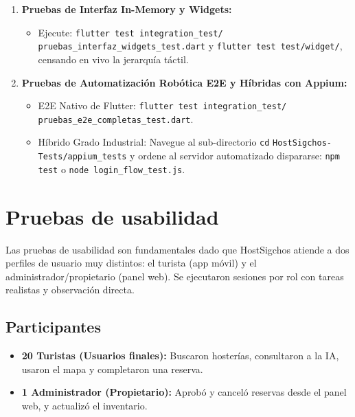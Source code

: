 \documentclass[12pt,letterpaper]{report}
\begin{document}
\begin{enumerate}
\begin{itemize}
    \end{itemize}
    \item \textbf{Pruebas de Interfaz In-Memory y Widgets:}
    \begin{itemize}
        \item Ejecute: \texttt{flutter test integration\_test/} \linebreak \texttt{pruebas\_interfaz\_widgets\_test.dart} y \texttt{flutter test test/widget/}, censando en vivo la jerarquía táctil.
    \end{itemize}
    \item \textbf{Pruebas de Automatización Robótica E2E y Híbridas con Appium:}
    \begin{itemize}
        \item E2E Nativo de Flutter: \texttt{flutter test integration\_test/} \linebreak \texttt{pruebas\_e2e\_completas\_test.dart}.
        \item Híbrido Grado Industrial: Navegue al sub-directorio \texttt{cd} \linebreak \texttt{HostSigchos-Tests/appium\_tests} y ordene al servidor automatizado dispararse: \linebreak \texttt{npm test} o \texttt{node login\_flow\_test.js}.
    \end{itemize}
\end{enumerate}

\section{Pruebas de usabilidad}
Las pruebas de usabilidad son fundamentales dado que HostSigchos atiende a dos perfiles de usuario muy distintos: el turista (app móvil) y el administrador/propietario (panel web). Se ejecutaron sesiones por rol con tareas realistas y observación directa.

\subsection{Participantes}
\begin{itemize}
  \item \textbf{20 Turistas (Usuarios finales):} Buscaron hosterías, consultaron a la IA, usaron el mapa y completaron una reserva.
  \item \textbf{1 Administrador (Propietario):} Aprobó y canceló reservas desde el panel web, y actualizó el inventario.
\end{itemize}
\end{document}
